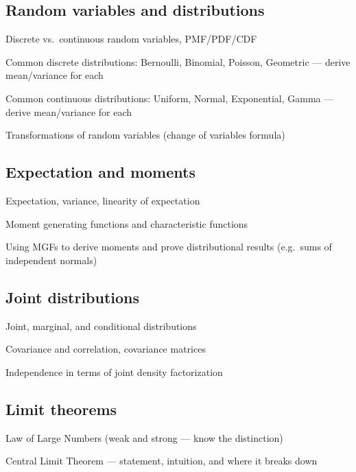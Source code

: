 \subsection{Random variables and distributions}
\begin{tasklist}
    \item Discrete vs.\ continuous random variables, PMF/PDF/CDF
    \item Common discrete distributions: Bernoulli, Binomial, Poisson, Geometric — derive mean/variance for each
    \item Common continuous distributions: Uniform, Normal, Exponential, Gamma — derive mean/variance for each
    \item Transformations of random variables (change of variables formula)
\end{tasklist}

\subsection{Expectation and moments}
\begin{tasklist}
    \item Expectation, variance, linearity of expectation
    \item Moment generating functions and characteristic functions
    \item Using MGFs to derive moments and prove distributional results (e.g.\ sums of independent normals)
\end{tasklist}

\subsection{Joint distributions}
\begin{tasklist}
    \item Joint, marginal, and conditional distributions
    \item Covariance and correlation, covariance matrices
    \item Independence in terms of joint density factorization
\end{tasklist}

\subsection{Limit theorems}
\begin{tasklist}
    \item Law of Large Numbers (weak and strong — know the distinction)
    \item Central Limit Theorem — statement, intuition, and where it breaks down
\end{tasklist}

